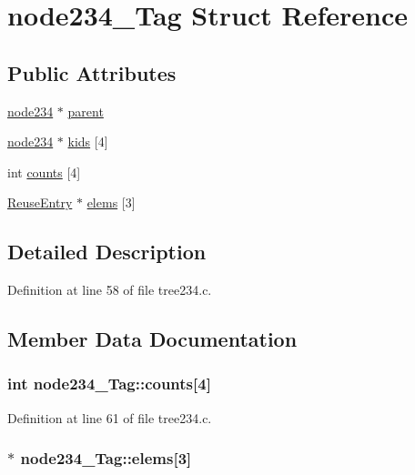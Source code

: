 \hypertarget{structnode234___tag}{
\section{node234\_\-Tag Struct Reference}
\label{structnode234___tag}
}
\subsection*{Public Attributes}
\begin{DoxyCompactItemize}
\item 
\hyperlink{structnode234___tag}{node234} $\ast$ \hyperlink{structnode234___tag_a3c3bdead5844de4df21b2980e7409157}{parent}
\item 
\hyperlink{structnode234___tag}{node234} $\ast$ \hyperlink{structnode234___tag_a0f783514c021d86027beb3211b43f3b7}{kids} \mbox{[}4\mbox{]}
\item 
int \hyperlink{structnode234___tag_a06142da7798558b8c6d59d1cb6471a10}{counts} \mbox{[}4\mbox{]}
\item 
\hyperlink{struct_reuse_entry}{ReuseEntry} $\ast$ \hyperlink{structnode234___tag_a55c085a9b0e3812d029a17f366e274f7}{elems} \mbox{[}3\mbox{]}
\end{DoxyCompactItemize}


\subsection{Detailed Description}


Definition at line 58 of file tree234.c.



\subsection{Member Data Documentation}
\hypertarget{structnode234___tag_a06142da7798558b8c6d59d1cb6471a10}{
\subsubsection[{counts}]{\setlength{\rightskip}{0pt plus 5cm}int {\bf node234\_\-Tag::counts}\mbox{[}4\mbox{]}}}
\label{structnode234___tag_a06142da7798558b8c6d59d1cb6471a10}


Definition at line 61 of file tree234.c.

\hypertarget{structnode234___tag_a55c085a9b0e3812d029a17f366e274f7}{
\subsubsection[{elems}]{$\ast$ {\bf node234\_\-Tag::elems}\mbox{[}3\mbox{]}}}
\label{structnode234___tag_a55c085a9b0e3812d029a17f366e274f7}


